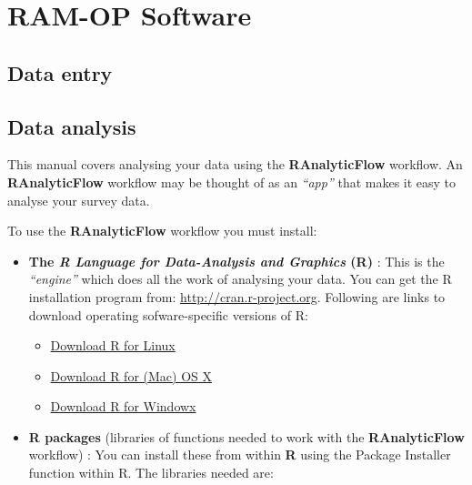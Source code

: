 \documentclass[12pt,a4paper]{book}
\theoremstyle{definition}
\theoremstyle{definition}
\theoremstyle{definition}
\theoremstyle{remark}
\begin{document}
\hypertarget{software}{%
\chapter{RAM-OP Software}\label{software}}

\hypertarget{data-entry}{%
\section{Data entry}\label{data-entry}}

\hypertarget{data-analysis}{%
\section{Data analysis}\label{data-analysis}}

This manual covers analysing your data using the \textbf{RAnalyticFlow}
workflow. An \textbf{RAnalyticFlow} workflow may be thought of as an
\emph{``app''} that makes it easy to analyse your survey data.

To use the \textbf{RAnalyticFlow} workflow you must install:

\begin{itemize}
\item
  \textbf{The \emph{R Language for Data-Analysis and Graphics} (R)} :
  This is the \emph{``engine''} which does all the work of analysing
  your data. You can get the R installation program from:
  \url{http://cran.r-project.org}. Following are links to download
  operating sofware-specific versions of R:

  \begin{itemize}
  \item
    \href{https://cran.r-project.org/bin/linux/}{Download R for Linux}
  \item
    \href{https://cran.r-project.org/bin/macosx/}{Download R for (Mac)
    OS X}
  \item
    \href{https://cran.r-project.org/bin/windows/}{Download R for
    Windowx}
  \end{itemize}
\item
  \textbf{R packages} (libraries of functions needed to work with the
  \textbf{RAnalyticFlow} workflow) : You can install these from within
  \textbf{R} using the Package Installer function within R. The
  libraries needed are:
\end{itemize}
\end{document}
